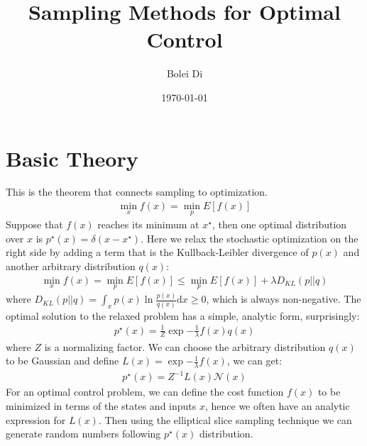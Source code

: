 \documentclass[11pt]{article}
\begin{document}
\title{\bf Sampling Methods for Optimal Control}
\date{\today}
\author{Bolei Di}
\maketitle
\begin{abstract}

\end{abstract}

\section{Basic Theory}\label{sec:intro}
This is the theorem that connects sampling to optimization.
\begin{gather*}
\min_x f(x) = \min_p E[f(x)]
\end{gather*}
Suppose that $f(x)$ reaches its minimum at $x^{\star}$, then one optimal distribution over $x$ is $p^{\star}(x)=\delta(x-x^{\star})$. 
Here we relax the stochastic optimization on the right side by adding a term that is the Kullback-Leibler divergence of $p(x)$ and another arbitrary distribution $q(x)$:
\begin{gather*}
\min_x f(x) = \min_p E[f(x)] \leq \min_p E[f(x)] + \lambda D_{KL}(p||q)
\end{gather*}
where $D_{KL}(p||q)=\int_x p(x) \ln \frac{p(x)}{q(x)} \text{d}x \geq 0$, which is always non-negative. 
The optimal solution to the relaxed problem has a simple, analytic form, surprisingly:
\begin{gather*}
p^{\star}(x) = \frac{1}{Z} \exp{-\frac{1}{\lambda}f(x)} q(x)
\end{gather*}
where $Z$ is a normalizing factor. 
We can choose the arbitrary distribution $q(x)$ to be Gaussian and define $L(x)=\exp{-\frac{1}{\lambda}f(x)}$, we can get:
\begin{gather*}
p^{\star}(x) = Z^{-1} L(x) \mathcal{N}(x)
\end{gather*}
For an optimal control problem, we can define the cost function $f(x)$ to be minimized in terms of the states and inputs $x$, hence we often have an analytic expression for $L(x)$. Then using the elliptical slice sampling technique we can generate random numbers following $p^{\star}(x)$ distribution. 
\end{document}
